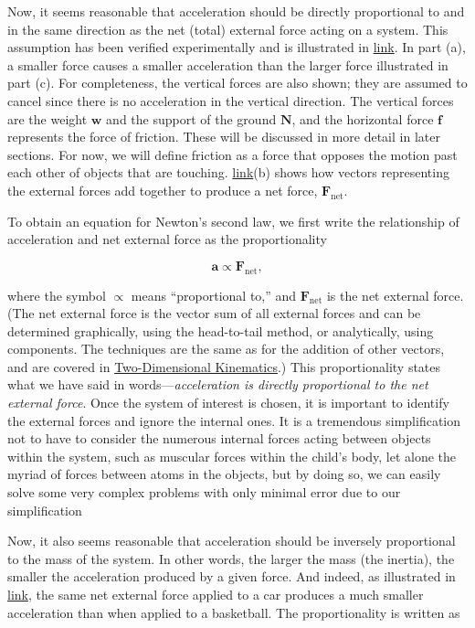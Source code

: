 \documentclass[
]{book}
\begin{document}
Now, it seems reasonable that acceleration should be directly
proportional to and in the same direction as the net (total) external
force acting on a system. This assumption has been verified
experimentally and is illustrated in
\protect\hyperlink{import-auto-id1993910}{link}. In part (a), a
smaller force causes a smaller acceleration than the larger force
illustrated in part (c). For completeness, the vertical forces are also
shown; they are assumed to cancel since there is no acceleration in the
vertical direction. The vertical forces are the weight \(\textbf{w}{}\)
and the support of the ground \(\textbf{N}{}\), and the horizontal force
\(\textbf{f}{}\) represents the force of friction. These will be discussed
in more detail in later sections. For now, we will define
\protect\hypertarget{import-auto-id2639388}{}{friction} as a force that
opposes the motion past each other of objects that are touching.
\protect\hyperlink{import-auto-id1993910}{link}(b) shows how
vectors representing the external forces add together to produce a net
force, \(\textbf{F}_{\text{net}}{}\).

To obtain an equation for Newton's second law, we first write the
relationship of acceleration and net external force as the
proportionality

\leavevmode{}%
\[{\textbf{a}{\propto}\textbf{F}_{\text{net}},}{}\]

where the symbol \(\propto\) means ``proportional to,'' and
\(\textbf{F}_{\text{net}}{}\) is the \protect\hypertarget{import-auto-id1890102}{}{net external
force}. (The net external force
is the vector sum of all external forces and can be determined
graphically, using the head-to-tail method, or analytically, using
components. The techniques are the same as for the addition of other
vectors, and are covered in \href{/m54779}{Two-Dimensional Kinematics}.) This
proportionality states what we have said in words---\emph{acceleration is
directly proportional to the net external force}. Once the system of
interest is chosen, it is important to identify the external forces and
ignore the internal ones. It is a tremendous simplification not to have
to consider the numerous internal forces acting between objects within
the system, such as muscular forces within the child's body, let alone
the myriad of forces between atoms in the objects, but by doing so, we
can easily solve some very complex problems with only minimal error due
to our simplification

Now, it also seems reasonable that acceleration should be inversely
proportional to the mass of the system. In other words, the larger the
mass (the inertia), the smaller the acceleration produced by a given
force. And indeed, as illustrated in
\protect\hyperlink{import-auto-id1375143}{link}, the same net
external force applied to a car produces a much smaller acceleration
than when applied to a basketball. The proportionality is written as
\end{document}
